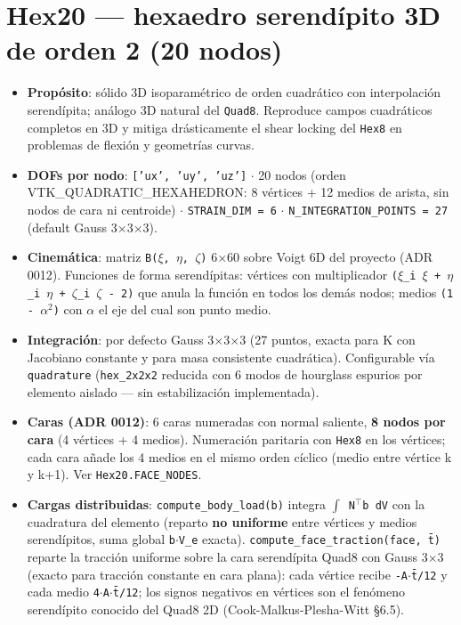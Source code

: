 \documentclass[11pt,letterpaper,oneside]{report}
\begin{document}
\section{Hex20 --- hexaedro serendípito 3D de orden 2 (20 nodos)}

\begin{itemize}
  \item \textbf{Propósito}: sólido 3D isoparamétrico de orden cuadrático con interpolación serendípita; análogo 3D natural del \texttt{Quad8}. Reproduce campos cuadráticos completos en 3D y mitiga drásticamente el shear locking del \texttt{Hex8} en problemas de flexión y geometrías curvas.
  \item \textbf{DOFs por nodo}: \texttt{['ux', 'uy', 'uz']} \ensuremath{\cdot} 20 nodos (orden VTK\_QUADRATIC\_HEXAHEDRON: 8 vértices + 12 medios de arista, sin nodos de cara ni centroide) \ensuremath{\cdot} \texttt{STRAIN\_DIM = 6} \ensuremath{\cdot} \texttt{N\_INTEGRATION\_POINTS = 27} (default Gauss 3\ensuremath{\times}3\ensuremath{\times}3).
  \item \textbf{Cinemática}: matriz \texttt{B(\ensuremath{\xi}, \ensuremath{\eta}, \ensuremath{\zeta})} 6\ensuremath{\times}60 sobre Voigt 6D del proyecto (ADR 0012). Funciones de forma serendípitas: vértices con multiplicador \texttt{(\ensuremath{\xi}\_i \ensuremath{\xi} + \ensuremath{\eta}\_i \ensuremath{\eta} + \ensuremath{\zeta}\_i \ensuremath{\zeta} - 2)} que anula la función en todos los demás nodos; medios \texttt{(1 - \ensuremath{\alpha}\ensuremath{^{2}})} con \texttt{\ensuremath{\alpha}} el eje del cual son punto medio.
  \item \textbf{Integración}: por defecto Gauss 3\ensuremath{\times}3\ensuremath{\times}3 (27 puntos, exacta para K con Jacobiano constante y para masa consistente cuadrática). Configurable vía \texttt{quadrature} (\texttt{hex\_2x2x2} reducida con 6 modos de hourglass espurios por elemento aislado --- sin estabilización implementada).
  \item \textbf{Caras (ADR 0012)}: 6 caras numeradas con normal saliente, \textbf{8 nodos por cara} (4 vértices + 4 medios). Numeración paritaria con \texttt{Hex8} en los vértices; cada cara añade los 4 medios en el mismo orden cíclico (medio entre vértice k y k+1). Ver \texttt{Hex20.FACE\_NODES}.
  \item \textbf{Cargas distribuidas}: \texttt{compute\_body\_load(b)} integra \texttt{\ensuremath{\int} N\ensuremath{^{\top}}b dV} con la cuadratura del elemento (reparto \textbf{no uniforme} entre vértices y medios serendípitos, suma global \texttt{b\ensuremath{\cdot}V\_e} exacta). \texttt{compute\_face\_traction(face, t̄)} reparte la tracción uniforme sobre la cara serendípita Quad8 con Gauss 3\ensuremath{\times}3 (exacto para tracción constante en cara plana): cada vértice recibe \texttt{-A\ensuremath{\cdot}t̄/12} y cada medio \texttt{4\ensuremath{\cdot}A\ensuremath{\cdot}t̄/12}; los signos negativos en vértices son el fenómeno serendípito conocido del Quad8 2D (Cook-Malkus-Plesha-Witt §6.5).

\end{itemize}
\end{document}

